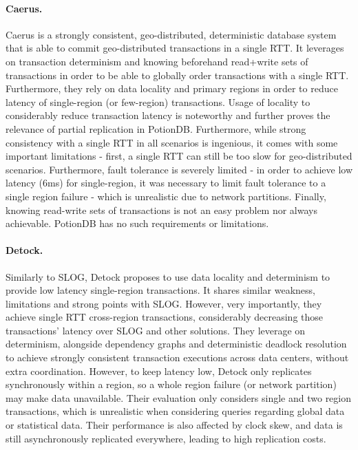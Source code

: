 \paragraph{Caerus.} Caerus is a strongly consistent, geo-distributed, deterministic database system that is able to commit geo-distributed transactions in a single RTT. It leverages on transaction determinism and knowing beforehand read+write sets of transactions in order to be able to globally order transactions with a single RTT. Furthermore, they rely on data locality and primary regions in order to reduce latency of single-region (or few-region) transactions. Usage of locality to considerably reduce transaction latency is noteworthy and further proves the relevance of partial replication in PotionDB. Furthermore, while strong consistency with a single RTT in all scenarios is ingenious, it comes with some important limitations - first, a single RTT can still be too slow for geo-distributed scenarios. Furthermore, fault tolerance is severely limited - in order to achieve low latency (6ms) for single-region, it was necessary to limit fault tolerance to a single region failure - which is unrealistic due to network partitions. Finally, knowing read-write sets of transactions is not an easy problem nor always achievable. PotionDB has no such requirements or limitations.

\paragraph{Detock.} Similarly to SLOG, Detock proposes to use data locality and determinism to provide low latency single-region transactions. It shares similar weakness, limitations and strong points with SLOG. However, very importantly, they achieve single RTT cross-region transactions, considerably decreasing those transactions’ latency over SLOG and other solutions. They leverage on determinism, alongside dependency graphs and deterministic deadlock resolution to achieve strongly consistent transaction executions across data centers, without extra coordination. However, to keep latency low, Detock only replicates synchronously within a region, so a whole region failure (or network partition) may make data unavailable. Their evaluation only considers single and two region transactions, which is unrealistic when considering queries regarding global data or statistical data. Their performance is also affected by clock skew, and data is still asynchronously replicated everywhere, leading to high replication costs.


